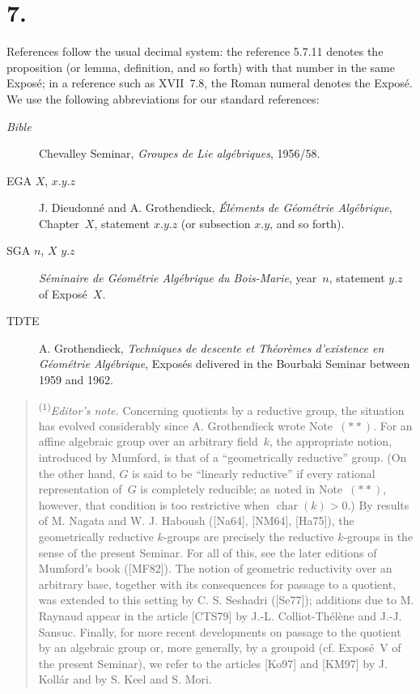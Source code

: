 \section*{7.}

References follow the usual decimal system: the reference 5.7.11 denotes the
proposition (or lemma, definition, and so forth) with that number in the same
Expos\'e; in a reference such as XVII~7.8, the Roman numeral denotes the Expos\'e.
We use the following abbreviations for our standard references:

\begin{description}
\item[\emph{Bible}] Chevalley Seminar, \emph{Groupes de Lie alg\'ebriques},
  1956/58.
\item[EGA $X$, $x.y.z$] J. Dieudonn\'e and A. Grothendieck,
  \emph{\'El\'ements de G\'eom\'etrie Alg\'ebrique}, Chapter~$X$, statement
  $x.y.z$ (or subsection $x.y$, and so forth).
\item[SGA $n$, $X$ $y.z$] \emph{S\'eminaire de G\'eom\'etrie Alg\'ebrique du
  Bois-Marie}, year~$n$, statement $y.z$ of Expos\'e~$X$.
\item[TDTE] A. Grothendieck, \emph{Techniques de descente et Th\'eor\`emes
  d'existence en G\'eom\'etrie Alg\'ebrique}, Expos\'es delivered in the Bourbaki
  Seminar between 1959 and 1962.
\end{description}

\begin{quote}\small
\noindent\textsuperscript{(1)}\emph{Editor's note.}
Concerning quotients by a reductive group, the situation has evolved considerably
since A. Grothendieck wrote Note~$(\ast\ast)$.  For an affine algebraic group over
an arbitrary field~$k$, the appropriate notion, introduced by Mumford, is that of a
``geometrically reductive'' group.  (On the other hand, $G$ is said to be ``linearly
reductive'' if every rational representation of~$G$ is completely reducible; as
noted in Note~$(\ast\ast)$, however, that condition is too restrictive when
$\operatorname{char}(k)>0$.)  By results of M. Nagata and W. J. Haboush
([Na64], [NM64], [Ha75]), the geometrically reductive $k$-groups are precisely the
reductive $k$-groups in the sense of the present Seminar.  For all of this, see the
later editions of Mumford's book ([MF82]).  The notion of geometric reductivity over
an arbitrary base, together with its consequences for passage to a quotient, was
extended to this setting by C. S. Seshadri ([Se77]); additions due to M. Raynaud
appear in the article [CTS79] by J.-L. Colliot-Th\'el\`ene and J.-J. Sansuc.
Finally, for more recent developments on passage to the quotient by an algebraic
group or, more generally, by a groupoid (cf. Expos\'e~V of the present Seminar), we
refer to the articles [Ko97] and [KM97] by J. Koll\'ar and by S. Keel and S. Mori.
\end{quote}

